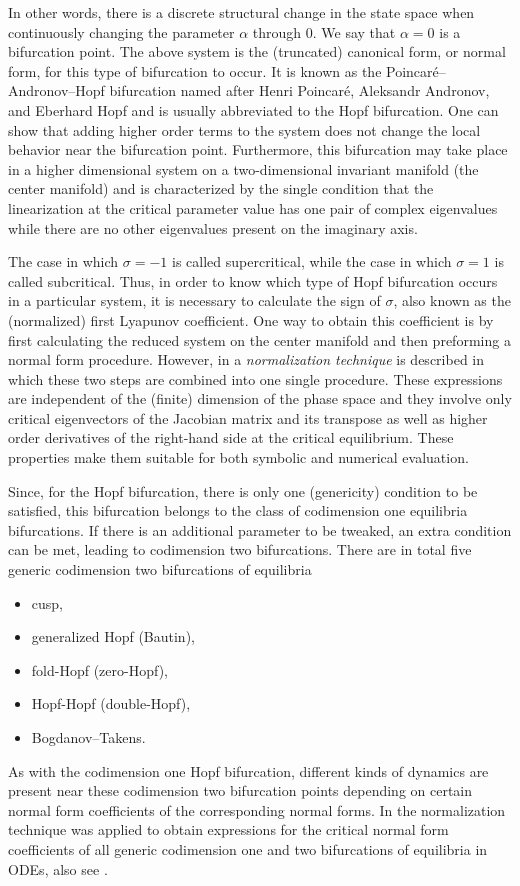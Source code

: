 In other words, there is a discrete structural change in the state space when
continuously changing the parameter $\alpha$ through $0$. We say that
$\alpha=0$ is a bifurcation point. The above system is the (truncated)
canonical form, or normal form, for this type of bifurcation to occur. It is
known as the Poincar\'e–Andronov–Hopf bifurcation named after Henri Poincar\'e,
Aleksandr Andronov, and Eberhard Hopf and is usually abbreviated to the Hopf
bifurcation. One can show that adding higher order terms to the system does
not change the local behavior near the bifurcation point. Furthermore, this
bifurcation may take place in a higher dimensional system on a two-dimensional
invariant manifold (the center manifold) and is characterized by the single
condition that the linearization at the critical parameter value has one pair
of complex eigenvalues while there are no other eigenvalues present on the
imaginary axis. 

The case in which $\sigma=-1$ is called supercritical, while the case in which
$\sigma=1$ is called subcritical. Thus, in order to know which type of Hopf
bifurcation occurs in a particular system, it is necessary to calculate the
sign of $\sigma$, also known as the (normalized) first Lyapunov coefficient. One way to
obtain this coefficient is by first calculating the reduced system on the
center manifold and then preforming a normal form procedure. However, in
\cite{Coullet1983competinginstabilities} a \emph{normalization technique} is
described in which these two steps are combined into one single procedure. These
expressions are independent of the (finite) dimension of the phase space and
they involve only critical eigenvectors of the Jacobian matrix and its
transpose as well as higher order derivatives of the right-hand side at the
critical equilibrium. These properties make them suitable for both symbolic and
numerical evaluation.

Since, for the Hopf bifurcation, there is only one (genericity) condition to be
satisfied, this bifurcation belongs to the class of codimension one equilibria
bifurcations. If there is an additional parameter to be tweaked, an extra
condition can be met, leading to codimension two bifurcations. There are in
total five generic codimension two bifurcations of equilibria
\begin{itemize}
    \item cusp,
    \item generalized Hopf (Bautin),
    \item fold-Hopf (zero-Hopf),
    \item Hopf-Hopf (double-Hopf),
    \item Bogdanov--Takens.
\end{itemize} 
As with the codimension one Hopf bifurcation, different kinds of dynamics are
present near these codimension two bifurcation points depending on certain
normal form coefficients of the corresponding normal forms. In
\cite{Kuznetsov1999} the normalization technique was applied to obtain
expressions for the critical normal form coefficients of all generic
codimension one and two bifurcations of equilibria in ODEs, also see \cite[\S
8.7]{Kuznetsov2004}. 

